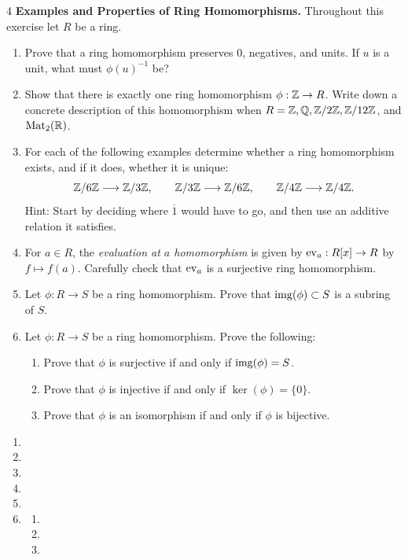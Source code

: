 \documentclass[Notebook.tex]{subfiles}
\begin{document}
\begin{problem}{4}\label{r:maps}
	\textbf{Examples and Properties of Ring Homomorphisms.} Throughout this exercise let $R$ be a ring.
	\begin{enumerate}[label=(\alph*),ref=\theenumi\alph*]
		\item Prove that a ring homomorphism preserves $0$, negatives, and units. If $u$ is a unit, what must $\phi(u)^{-1}$ be?
		\item Show that there is exactly one ring homomorphism $\phi:\mathbb Z\to R$. Write down a concrete description of this homomorphism when $R=\mathbb Z,\mathbb Q,\mathbb Z/2\mathbb Z,\mathbb Z/12\mathbb Z$, and $\operatorname{Mat}_{2}(\mathbb R)$.
		\item For each of the following examples determine whether a ring homomorphism exists, and if it does, whether it is unique:
		\[
		\mathbb Z/6\mathbb Z\longrightarrow\mathbb Z/3\mathbb Z,\qquad \mathbb Z/3\mathbb Z\longrightarrow\mathbb Z/6\mathbb Z,\qquad \mathbb Z/4\mathbb Z\longrightarrow\mathbb Z/4\mathbb Z.
		\]
		Hint: Start by deciding where $\overline1$ would have to go, and then use an additive relation it satisfies.
		\item For $a\in R$, the \emph{evaluation at $a$ homomorphism} is given by $\operatorname{ev}_a:R[x]\to R$ by $f\mapsto f(a)$. Carefully check that $\operatorname{ev}_{a}$ is a surjective ring homomorphism.
		\item Let $\phi:R \to S$ be a ring homomorphism. Prove that $\operatorname{img}(\phi) \subset S$ is a subring of $S$.
		\item Let $\phi:R \to S$ be a ring homomorphism. Prove the following:
		\begin{enumerate}[label=(\roman*),ref=\theenumi\roman*]
			\item Prove that $\phi$ is surjective if and only if $\operatorname{img}(\phi)=S$.
			\item Prove that $\phi$ is injective if and only if $\ker(\phi)=\{0\}$.
			\item Prove that $\phi$ is an isomorphism if and only if $\phi$ is bijective.
		\end{enumerate}
	\end{enumerate}
\end{problem}

\begin{solution}
	\bbni
	\begin{enumerate}[label=(\alph*),ref=\theenumi\alph*]
		\item
		\item
		\item
		\item
		\item
		\item
		\begin{enumerate}[label=(\roman*),ref=\theenumi\roman*]
			\item
			\item
			\item
		\end{enumerate}
	\end{enumerate}
\end{solution}
\end{document}
